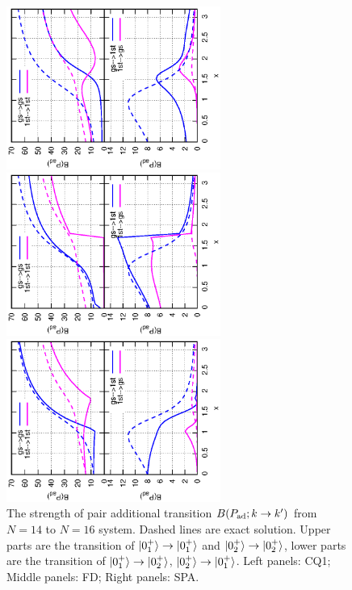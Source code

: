 \documentclass[%
superscriptaddress,
preprint,
showpacs,
nofootinbib,
amsmath,amssymb,
prc,
floatfix ]%
{revtex4-1}
\begin{document}
\begin{figure}[htbp]
 \begin{minipage}{0.3\hsize}
 \begin{center}
  \includegraphics[width=70mm,angle=-90]{images/N16Pad_CQ.eps}
 \end{center}
 \captionsetup{labelformat=empty,labelsep=none}
 \end{minipage}
 \begin{minipage}{0.3\hsize}
 \begin{center}
  \includegraphics[width=70mm,angle=-90]{images/N16Pad_FD.eps}
 \end{center}
 \captionsetup{labelformat=empty,labelsep=none}
 \end{minipage}
 \begin{minipage}{0.3\hsize}
 \begin{center}
  \includegraphics[width=70mm,angle=-90]{images/N16Pad_SPA.eps}
 \end{center}
 \captionsetup{labelformat=empty,labelsep=none}
 \end{minipage}
 \caption{The strength of pair additional transition $B(P_{\rm ad};k\rightarrow k')$ from $N=14$ to $N=16$ system. Dashed lines are exact solution. Upper parts are the transition of $\ket{0_1^+}\to\ket{0_1^+}$ and $\ket{0_2^+}\to\ket{0_2^+}$, lower parts are the transition of $\ket{0_1^+}\to\ket{0_2^+}$, $\ket{0_2^+}\to\ket{0_1^+}$. Left panels: CQ1; Middle panels: FD; Right panels: SPA.}
 \label{fig:N16Pad}
\end{figure}
\end{document}
